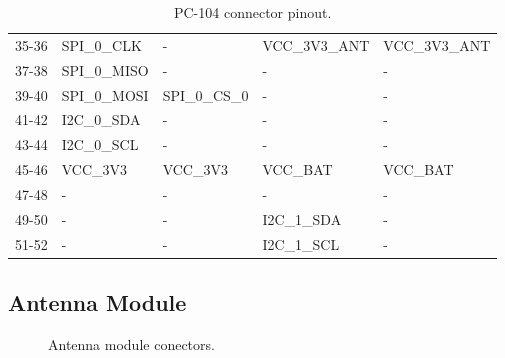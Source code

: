 \begin{table}[!h]
\begin{tabular}{cllll}
        35-36              & SPI\_0\_CLK      & -                & VCC\_3V3\_ANT & VCC\_3V3\_ANT \\
        37-38              & SPI\_0\_MISO     & -                & -             & -             \\
        39-40              & SPI\_0\_MOSI     & SPI\_0\_CS\_0    & -             & -             \\
        41-42              & I2C\_0\_SDA      & -                & -             & -             \\
        43-44              & I2C\_0\_SCL      & -                & -             & -             \\
        45-46              & VCC\_3V3         & VCC\_3V3         & VCC\_BAT      & VCC\_BAT      \\
        47-48              & -                & -                & -             & -             \\
        49-50              & -                & -                & I2C\_1\_SDA   & -             \\
        51-52              & -                & -                & I2C\_1\_SCL   & -             \\
        \bottomrule[1.5pt]
    \end{tabular}
    \caption{PC-104 connector pinout.}
    \label{tab:pc104-pins}
\end{table}

\subsection{Antenna Module}

\begin{figure}[!htb]
    \begin{center}
        \qquad
        \caption{Antenna module conectors.}
        \label{fig:ant-connectors}
    \end{center}
\end{figure}


